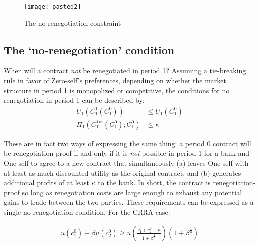 \documentclass[11pt,english]{article}
\theoremstyle{plain}
\theoremstyle{definition}
\begin{document}
 
\begin{figure}[p]
\texttt{[image: pasted2]}\caption{The no-renegotiation constraint}
\label{fig:renegproof} 
\end{figure}


\subsection{The `no-renegotiation' condition}

\label{sec-no-reneg-cond}

When will a contract \textit{not} be renegotiated in period 1? Assuming
a tie-breaking rule in favor of Zero-self's preferences, depending
on whether the market structure in period 1 is monopolized or competitive,
the conditions for no renegotiation in period 1 can be described by:
\begin{align}
U_{1}\left(C_{1}^{1}\left(C_{1}^{0}\right)\right) & \leq U_{1}\left(C_{1}^{0}\right)\label{eq:no-reg-comp}\\
\Pi_{1}\left(C_{1}^{1m}\left(C_{1}^{0}\right);C_{1}^{0}\right) & \leq\kappa\label{eq:no-reg-monop}
\end{align}

These are in fact two ways of expressing the same thing: a period
0 contract will be renegotiation-proof if and only if it is \textit{not}
possible in period 1 for a bank and One-self to agree to a new contract
that simultaneously (a) leaves One-self with at least as much discounted
utility as the original contract, and (b) generates additional profits
of at least $\kappa$ to the bank. In short, the contract is renegotiation-proof
so long as renegotiation costs are large enough to exhaust any potential
gains to trade between the two parties. These requirements can be
expressed as a single no-renegotiation condition. For the CRRA case:

\begin{align}
u(c_{1}^{0})+\beta u(c_{2}^{0})\ge u\left(\frac{c_{1}^{0}+c_{2}^{0}-\kappa}{1+\beta^{\frac{1}{\rho}}}\right)(1+\beta^{\frac{1}{\rho}})\label{ineq:noreg}
\end{align}
\end{document}
